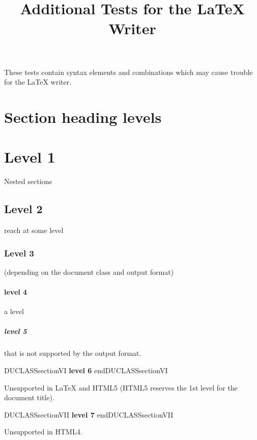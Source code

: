 \documentclass[a4paper]{article}
\newenvironment{DUclass}[1]%
    {%
     \def\DocutilsClassFunctionName{DUCLASS#1}
     \csname \DocutilsClassFunctionName \endcsname}%
    {\csname end\DocutilsClassFunctionName \endcsname}%
\providecommand*{\DUtitle}[1]{%
  \smallskip\noindent\textbf{#1}\smallskip}
\begin{document}
\title{Additional Tests for the LaTeX Writer}
\author{}
\date{}
\maketitle

These tests contain syntax elements and combinations which may cause
trouble for the LaTeX writer.

\tableofcontents


\section{Section heading levels}


\section{Level 1}

Nested sections


\subsection{Level 2}

reach at some level


\subsubsection{Level 3}

(depending on the document class and output format)


\paragraph{level 4}

a level


\subparagraph{level 5}

that is not supported by the output format.


\begin{DUclass}{sectionVI}
\DUtitle{level 6}
\end{DUclass}

Unsupported in LaTeX and HTML5
(HTML5 reserves the 1st level for the document title).


\begin{DUclass}{sectionVII}
\DUtitle{level 7}
\end{DUclass}

Unsupported in HTML4.
\end{document}
